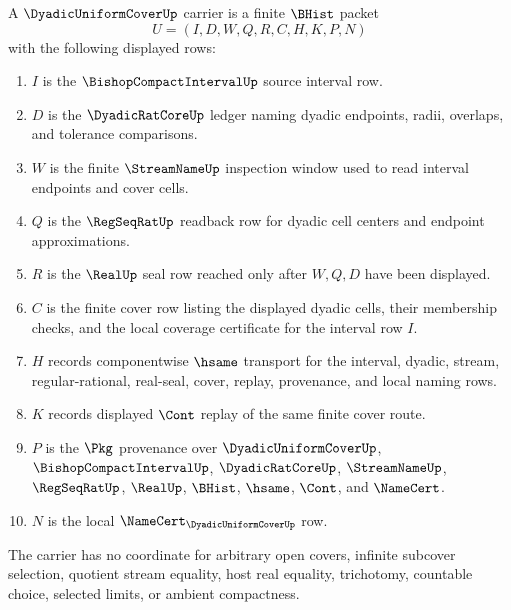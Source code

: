 \begin{definition}
\label{def:dyadic-uniform-cover-carrier}
A $\DyadicUniformCoverUp$ carrier is a finite $\BHist$ packet
$$
U=(I,D,W,Q,R,C,H,K,P,N)
$$
with the following displayed rows:
\begin{enumerate}
\item $I$ is the $\BishopCompactIntervalUp$ source interval row.
\item $D$ is the $\DyadicRatCoreUp$ ledger naming dyadic endpoints, radii, overlaps, and tolerance comparisons.
\item $W$ is the finite $\StreamNameUp$ inspection window used to read interval endpoints and cover cells.
\item $Q$ is the $\RegSeqRatUp$ readback row for dyadic cell centers and endpoint approximations.
\item $R$ is the $\RealUp$ seal row reached only after $W,Q,D$ have been displayed.
\item $C$ is the finite cover row listing the displayed dyadic cells, their membership checks, and the local coverage certificate for the interval row $I$.
\item $H$ records componentwise $\hsame$ transport for the interval, dyadic, stream, regular-rational, real-seal, cover, replay, provenance, and local naming rows.
\item $K$ records displayed $\Cont$ replay of the same finite cover route.
\item $P$ is the $\Pkg$ provenance over $\DyadicUniformCoverUp$, $\BishopCompactIntervalUp$, $\DyadicRatCoreUp$, $\StreamNameUp$, $\RegSeqRatUp$, $\RealUp$, $\BHist$, $\hsame$, $\Cont$, and $\NameCert$.
\item $N$ is the local $\NameCert_{\DyadicUniformCoverUp}$ row.
\end{enumerate}
The carrier has no coordinate for arbitrary open covers, infinite subcover selection, quotient stream equality, host real equality, trichotomy, countable choice, selected limits, or ambient compactness.
\end{definition}

